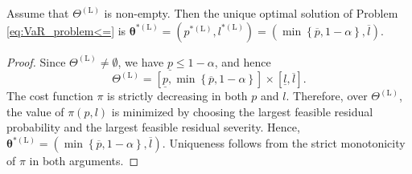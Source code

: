 \documentclass[a4paper,12pt]{article}
\begin{document}
\begin{proposition}\label{lemma:VaR_problem<=}
Assume that $\Theta^{\left(\text{L}\right)}$ is non-empty. Then the unique optimal solution of Problem \eqref{eq:VaR_problem<=} is ${\bm\theta}^{*\left(\text{L}\right)}=\left(p^{*\left(\text{L}\right)},l^{*\left(\text{L}\right)}\right)=\left(\min\left\{\overline{p},1-\alpha\right\},\overline{l}\right)$.
\end{proposition}
\begin{proof}
Since $\Theta^{\left(\text{L}\right)}\neq\emptyset$, we have $\underline{p}\leq 1-\alpha$, and hence
\begin{equation*}
\Theta^{\left(\text{L}\right)}=\left[\underline{p},\min\left\{\overline{p},1-\alpha\right\}\right]\times\left[\underline{l},\overline{l}\right].
\end{equation*}
The cost function $\pi$ is strictly decreasing in both $p$ and $l$. Therefore, over $\Theta^{\left(\text{L}\right)}$, the value of $\pi\left(p,l\right)$ is minimized by choosing the largest feasible residual probability and the largest feasible residual severity. Hence, ${\bm\theta}^{*\left(\text{L}\right)}=\left(\min\left\{\overline{p},1-\alpha\right\},\overline{l}\right)$. Uniqueness follows from the strict monotonicity of $\pi$ in both arguments.
\end{proof}
\end{document}
